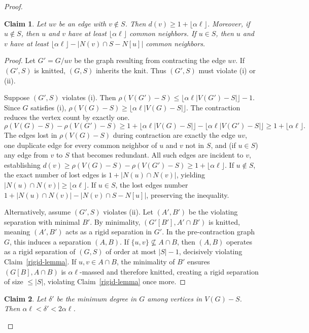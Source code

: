 \documentclass[11pt]{amsart}
\newtheorem{claim}{Claim}
\begin{document}
\begin{proof}
\begin{claim}\label{lemma-common}
Let $uv$ be an edge with $v \notin S$. Then $d(v) \ge 1+\lfloor\alpha \ell\rfloor$. Moreover, if $u \notin S$, then $u$ and $v$ have at least $\lfloor\alpha \ell\rfloor$ common neighbors. If $u \in S$, then $u$ and $v$ have at least $\lfloor\alpha \ell\rfloor - |N(v)\cap S-N[u]|$ common neighbors.
\end{claim}

\begin{proof}
Let $G'=G/uv$ be the graph resulting from contracting the edge $uv$. If $(G', S)$ is knitted, $(G, S)$ inherits the knit. Thus $(G', S)$ must violate (i) or (ii).

Suppose $(G', S)$ violates (i). Then $\rho(V(G')-S) \le \lfloor\alpha \ell |V(G')-S|\rfloor - 1$. Since $G$ satisfies (i), $\rho(V(G)-S)\ge \lfloor\alpha \ell |V(G)-S|\rfloor$. The contraction reduces the vertex count by exactly one.
\[ \rho(V(G)-S) - \rho(V(G')-S)\ge 1+\lfloor\alpha\ell |V(G)-S|\rfloor - \lfloor\alpha\ell|V(G')-S|\rfloor 
\ge 1+\lfloor\alpha\ell\rfloor. \]
The edges lost in $\rho(V(G)-S)$ during contraction are exactly the edge $uv$, one duplicate edge for every common neighbor of $u$ and $v$ not in $S$, and (if $u \in S$) any edge from $v$ to $S$ that becomes redundant. All such edges are incident to $v$, establishing $d(v) \ge \rho(V(G)-S) - \rho(V(G')-S)\ge 1+ \lfloor\alpha\ell\rfloor$. 
If $u \notin S$, the exact number of lost edges is $1 + |N(u) \cap N(v)|$, yielding $|N(u) \cap N(v)|\ge\lfloor \alpha \ell\rfloor$. If $u \in S$, the lost edges number $1 + |N(u) \cap N(v)| - |N(v) \cap S - N[u]|$, preserving the inequality.

Alternatively, assume $(G',S)$ violates (ii). Let $(A',B')$ be the violating separation with minimal $B'$. By minimality, $(G'[B'], A'\cap B')$ is knitted, meaning $(A', B')$ acts as a rigid separation in $G'$. In the pre-contraction graph $G$, this induces a separation $(A,B)$. If $\{u,v\} \not\subseteq A\cap B$, then $(A,B)$ operates as a rigid separation of $(G,S)$ of order at most $|S|-1$, decisively violating Claim~\ref{rigid-lemma}. If $u,v \in A\cap B$, the minimality of $B'$ ensures $(G[B], A\cap B)$ is $\alpha\ell$-massed and therefore knitted, creating a rigid separation of size $\le |S|$, violating Claim~\ref{rigid-lemma} once more.
\end{proof}

\begin{claim}
Let $\delta'$ be the minimum degree in $G$ among vertices in $V(G)-S$. Then $\alpha \ell < \delta' < 2\alpha \ell$. 
\end{claim}


\end{proof}
\end{document}

